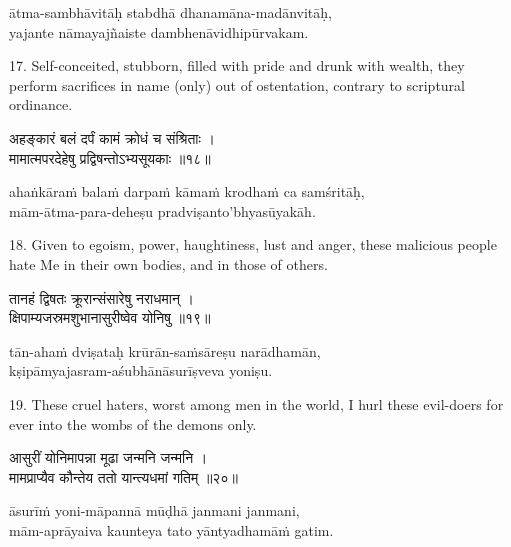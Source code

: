 \begin{transliteration}
ātma-sambhāvitāḥ stabdhā dhanamāna-madānvitāḥ, \\
yajante nāmayajñaiste dambhenāvidhipūrvakam.
\end{transliteration}

17. Self-conceited, stubborn, filled with pride and drunk with wealth, they
perform sacrifices in name (only) out of ostentation, contrary to scriptural
ordinance.

\begin{gitaverse}
अहङ्कारं बलं दर्पं कामं क्रोधं च संश्रिताः । \\
मामात्मपरदेहेषु प्रद्विषन्तोऽभ्यसूयकाः ॥१८॥
\end{gitaverse}

\begin{transliteration}
ahaṅkāraṁ balaṁ darpaṁ kāmaṁ krodhaṁ ca samśritāḥ, \\
mām-ātma-para-deheṣu pradviṣanto'bhyasūyakāh.
\end{transliteration}

18. Given to egoism, power, haughtiness, lust and anger, these malicious people
hate Me in their own bodies, and in those of others.

\begin{gitaverse}
तानहं द्विषतः क्रूरान्संसारेषु नराधमान् । \\
क्षिपाम्यजस्रमशुभानासुरीष्वेव योनिषु ॥१९॥
\end{gitaverse}

\begin{transliteration}
tān-ahaṁ dviṣataḥ krūrān-saṁsāreṣu narādhamān, \\
kṣipāmyajasram-aśubhānāsurīṣveva yoniṣu.
\end{transliteration}

19. These cruel haters, worst among men in the world, I hurl these evil-doers
for ever into the wombs of the demons only.

\begin{gitaverse}
आसुरीं योनिमापन्ना मूढा जन्मनि जन्मनि । \\
मामप्राप्यैव कौन्तेय ततो यान्त्यधमां गतिम् ॥२०॥
\end{gitaverse}

\begin{transliteration}
āsurīṁ yoni-māpannā mūḍhā janmani janmani, \\
mām-aprāyaiva kaunteya tato yāntyadhamāṁ gatim.
\end{transliteration}

